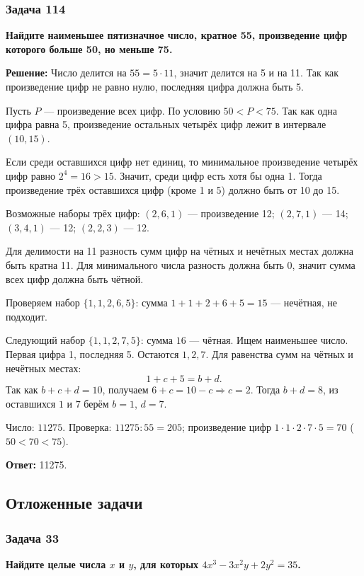 \documentclass[12pt, a4paper]{article}
\begin{document}
\subsubsection*{Задача 114}
\textbf{Найдите наименьшее пятизначное число, кратное 55, произведение цифр которого больше 50, но меньше 75.}

\textbf{Решение:}
Число делится на $55 = 5 \cdot 11$, значит делится на 5 и на 11. Так как произведение цифр не равно нулю, последняя цифра должна быть 5.

Пусть $P$ — произведение всех цифр. По условию $50 < P < 75$. Так как одна цифра равна 5, произведение остальных четырёх цифр лежит в интервале $(10, 15)$.

Если среди оставшихся цифр нет единиц, то минимальное произведение четырёх цифр равно $2^4 = 16 > 15$. Значит, среди цифр есть хотя бы одна 1. Тогда произведение трёх оставшихся цифр (кроме 1 и 5) должно быть от 10 до 15.

Возможные наборы трёх цифр: $(2,6,1)$ — произведение 12; $(2,7,1)$ — 14; $(3,4,1)$ — 12; $(2,2,3)$ — 12.

Для делимости на 11 разность сумм цифр на чётных и нечётных местах должна быть кратна 11. Для минимального числа разность должна быть 0, значит сумма всех цифр должна быть чётной.

Проверяем набор $\{1,1,2,6,5\}$: сумма $1+1+2+6+5 = 15$ — нечётная, не подходит.

Следующий набор $\{1,1,2,7,5\}$: сумма $16$ — чётная. Ищем наименьшее число. Первая цифра 1, последняя 5. Остаются $1, 2, 7$. Для равенства сумм на чётных и нечётных местах:
\[
1 + c + 5 = b + d.
\]
Так как $b+c+d = 10$, получаем $6+c = 10-c \Rightarrow c=2$. Тогда $b+d = 8$, из оставшихся $1$ и $7$ берём $b=1$, $d=7$.

Число: $11275$. Проверка: $11275 : 55 = 205$; произведение цифр $1 \cdot 1 \cdot 2 \cdot 7 \cdot 5 = 70$ ($50 < 70 < 75$).

\textbf{Ответ:} 11275.

\subsection*{Отложенные задачи}

\subsubsection*{Задача 33}
\textbf{Найдите целые числа $x$ и $y$, для которых $4x^3 - 3x^2 y + 2y^2 = 35$.}
\end{document}
